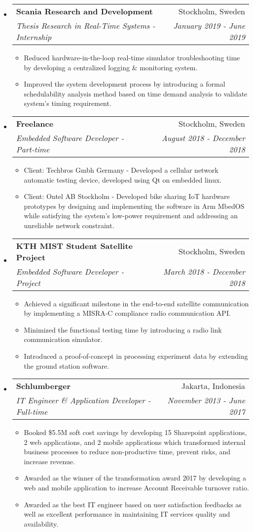 \documentclass[letterpaper,9pt]{article}
\makeatletter
\newcommand{\resitem}[1]{\item #1 \vspace{-2pt}}
\newcommand{\ressubheading}[4]{
\begin{tabular*}{7.0in}{l@{\cftdotfill{\cftsecdotsep}\extracolsep{\fill}}r}
		\textbf{#1} & #2 \\
        \textit{#3} & \textit{#4} \\
\end{tabular*}\vspace{-6.3pt}}
\makeatother
\begin{document}
\begin{itemize}
  \item
        \ressubheading{Scania Research and Development}{Stockholm, Sweden}{Thesis Research in Real-Time Systems - Internship}{January 2019 - June 2019}
        \begin{itemize}
          \resitem{Reduced hardware-in-the-loop real-time simulator troubleshooting time by developing a centralized logging \& monitoring system.}
          \resitem{Improved the system development process by introducing a formal schedulability analysis method based on time demand analysis to validate system's timing requirement.}
        \end{itemize}

  \item
        \ressubheading{Freelance}{Stockholm, Sweden}{Embedded Software Developer - Part-time}{August 2018 - December 2018}
        \begin{itemize}
          \resitem{Client: Techbros Gmbh Germany - Developed a cellular network automatic testing device, developed using Qt on embedded linux.}
          \resitem{Client: Ontel AB Stockholm - Developed bike sharing IoT hardware prototypes by designing and implementing the software in Arm MbedOS while satisfying the system's low-power requirement and addressing an unreliable network constraint.}
        \end{itemize}

  \item
        \ressubheading{KTH MIST Student Satellite Project}{Stockholm, Sweden}{Embedded Software Developer - Project}{March 2018 - December 2018}
        \begin{itemize}
          \resitem{Achieved a significant milestone in the end-to-end satellite communication by implementing a MISRA-C compliance radio communication API.}
          \resitem{Minimized the functional testing time by introducing a radio link communication simulator.}
          \resitem{Introduced a proof-of-concept in processing experiment data by extending the ground station software.}
        \end{itemize}

  \item
        \ressubheading{Schlumberger}{Jakarta, Indonesia}{IT Engineer \& Application Developer - Full-time}{November 2013 - June 2017}
        \begin{itemize}
          \resitem{Booked \$5.5M soft cost savings by developing 15 Sharepoint applications, 2 web applications, and 2 mobile applications which transformed internal business processes to reduce non-productive time, prevent risks, and increase revenue.}
          \resitem{Awarded as the winner of the transformation award 2017 by developing a web and mobile application to increase Account Receivable turnover ratio.}
          \resitem{Awarded as the best IT engineer based on user satisfaction feedbacks as well as excellent performance in maintaining IT services quality and availability.}
        \end{itemize}

\end{itemize} \vspace{-15pt}
\end{document}
